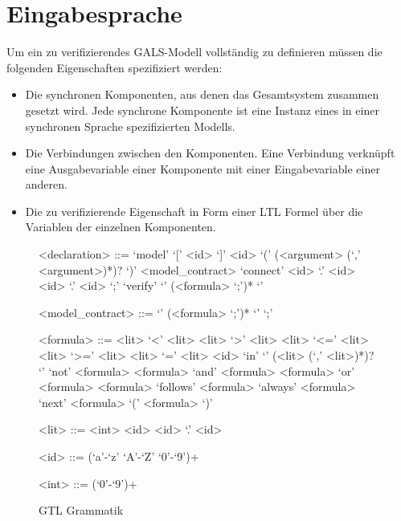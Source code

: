 \section{Eingabesprache}
Um ein zu verifizierendes GALS-Modell vollständig zu definieren müssen die folgenden Eigenschaften spezifiziert werden:
\begin{itemize}
\item Die synchronen Komponenten, aus denen das Gesamtsystem zusammen gesetzt wird.
  Jede synchrone Komponente ist eine Instanz eines in einer synchronen Sprache spezifizierten Modells.
\item Die Verbindungen zwischen den Komponenten.
  Eine Verbindung verknüpft eine Ausgabevariable einer Komponente mit einer Eingabevariable einer anderen.
\item Die zu verifizierende Eigenschaft in Form einer LTL Formel über die Variablen der einzelnen Komponenten.
\end{itemize}

\begin{figure}
  \begin{grammar}
    <declaration> ::= `model' `[' <id> `]' <id> `(' (<argument> (`,' <argument>)*)? `)' <model\_contract>
    \alt `connect' <id> `.' <id> <id> `.' <id> `;'
    \alt `verify' `{' (<formula> `;')* `}'
    
    <model\_contract> ::= `{' (<formula> `;')* `}'
    \alt `;'
    
    <formula> ::= <lit> `<' <lit>
    \alt <lit> `>' <lit>
    \alt <lit> `<=' <lit>
    \alt <lit> `>=' <lit>
    \alt <lit> `=' <lit>
    \alt <id> `in' `{' (<lit> (`,' <lit>)*)? `}'
    \alt `not' <formula>
    \alt <formula> `and' <formula>
    \alt <formula> `or' <formula>
    \alt <formula> `follows' <formula>
    \alt `always' <formula>
    \alt `next' <formula>
    \alt `(' <formula> `)'
    
    <lit> ::= <int>
    \alt <id>
    \alt <id> `.' <id>
    
    <id> ::= (`a'-`z' `A'-`Z' `0'-`9')+
    
    <int> ::= (`0'-`9')+
  \end{grammar}
  \caption{GTL Grammatik}
\end{figure}



